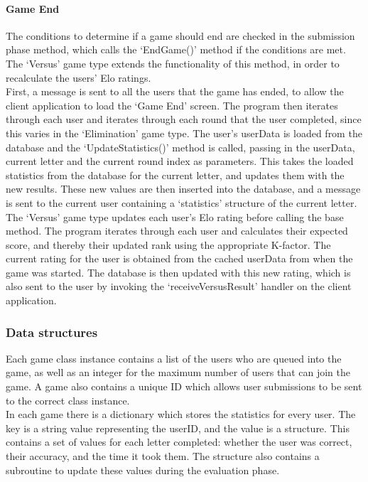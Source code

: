 \documentclass{article}
\begin{document}
\paragraph{Game End\\}

The conditions to determine if a game should end are checked in the submission phase method, which calls the `EndGame()' method if the conditions are met. The `Versus' game type extends the functionality of this method, in order to recalculate the users' Elo ratings. \\

First, a message is sent to all the users that the game has ended, to allow the client application to load the `Game End' screen. The program then iterates through each user and iterates through each round that the user completed, since this varies in the `Elimination' game type. The user's userData is loaded from the database and the `UpdateStatistics()' method is called, passing in the userData, current letter and the current round index as parameters. This takes the loaded statistics from the database for the current letter, and updates them with the new results. These new values are then inserted into the database, and a message is sent to the current user containing a `statistics' structure of the current letter. \\

The `Versus' game type updates each user's Elo rating before calling the base method. The program iterates through each user and calculates their expected score, and thereby their updated rank using the appropriate K-factor. The current rating for the user is obtained from the cached userData from when the game was started. The database is then updated with this new rating, which is also sent to the user by invoking the `receiveVersusResult' handler on the client application.

\subsubsection{Data structures}

Each game class instance contains a list of the users who are queued into the game, as well as an integer for the maximum number of users that can join the game. A game also contains a unique ID which allows user submissions to be sent to the correct class instance. \\

In each game there is a dictionary which stores the statistics for every user. The key is a string value representing the userID, and the value is a structure. This contains a set of values for each letter completed: whether the user was correct, their accuracy, and the time it took them. The structure also contains a subroutine to update these values during the evaluation phase.
\end{document}
